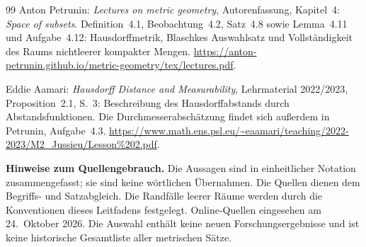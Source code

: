 \begin{thebibliography}{99}
Anton Petrunin: \emph{Lectures on metric geometry},
Autorenfassung, Kapitel~4: \emph{Space of subsets}.
Definition~4.1, Beobachtung~4.2, Satz~4.8 sowie Lemma~4.11 und
Aufgabe~4.12: Hausdorffmetrik, Blaschkes Auswahlsatz und Vollständigkeit
des Raums nichtleerer kompakter Mengen.
\url{https://anton-petrunin.github.io/metric-geometry/tex/lectures.pdf}.

Eddie Aamari: \emph{Hausdorff Distance and Measurability},
Lehrmaterial 2022/2023, Proposition~2.1, S.~3:
Beschreibung des Hausdorffabstands durch Abstandsfunktionen.
Die Durchmesserabschätzung findet sich außerdem in Petrunin,
Aufgabe~4.3.
\url{https://www.math.ens.psl.eu/~eaamari/teaching/2022-2023/M2_Jussieu/Lesson%202.pdf}.
\end{thebibliography}

\begingroup
\footnotesize
\noindent\textbf{Hinweise zum Quellengebrauch.}
Die Aussagen sind in einheitlicher Notation zusammengefasst; sie sind keine
wörtlichen Übernahmen. Die Quellen dienen dem Begriffs- und Satzabgleich.
Die Randfälle leerer Räume werden durch die Konventionen dieses Leitfadens
festgelegt. Online-Quellen eingesehen am 24.~Oktober 2026.
Die Auswahl enthält keine neuen Forschungsergebnisse und ist keine
historische Gesamtliste aller metrischen Sätze.
\endgroup